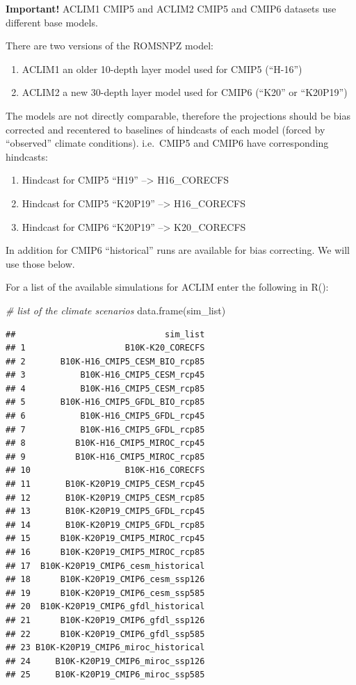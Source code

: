 \documentclass[
]{article}
\newenvironment{Shaded}{\begin{snugshade}}{\end{snugshade}}
\newcommand{\CommentTok}[1]{\textcolor[rgb]{0.56,0.35,0.01}{\textit{#1}}}
\newcommand{\FunctionTok}[1]{\textcolor[rgb]{0.00,0.00,0.00}{#1}}
\newcommand{\NormalTok}[1]{#1}
\providecommand{\tightlist}{%
  \setlength{\itemsep}{0pt}\setlength{\parskip}{0pt}}
\begin{document}
\textbf{Important!} ACLIM1 CMIP5 and ACLIM2 CMIP5 and CMIP6 datasets use
different base models.

There are two versions of the ROMSNPZ model:

\begin{enumerate}
\def\labelenumi{\arabic{enumi}.}
\tightlist
\item
  ACLIM1 an older 10-depth layer model used for CMIP5 (``H-16'')
\item
  ACLIM2 a new 30-depth layer model used for CMIP6 (``K20'' or
  ``K20P19'')
\end{enumerate}

The models are not directly comparable, therefore the projections should
be bias corrected and recentered to baselines of hindcasts of each model
(forced by ``observed'' climate conditions). i.e.~CMIP5 and CMIP6 have
corresponding hindcasts:

\begin{enumerate}
\def\labelenumi{\arabic{enumi}.}
\tightlist
\item
  Hindcast for CMIP5 ``H19'' --\textgreater{} H16\_CORECFS
\item
  Hindcast for CMIP5 ``K20P19'' --\textgreater{} H16\_CORECFS
\item
  Hindcast for CMIP6 ``K20P19'' --\textgreater{} K20\_CORECFS
\end{enumerate}

In addition for CMIP6 ``historical'' runs are available for bias
correcting. We will use those below.

For a list of the available simulations for ACLIM enter the following in
R():

\begin{Shaded}
\begin{Highlighting}[]
    \CommentTok{\# list of the climate scenarios}
    \FunctionTok{data.frame}\NormalTok{(sim\_list)}
\end{Highlighting}
\end{Shaded}

\begin{verbatim}
##                              sim_list
## 1                    B10K-K20_CORECFS
## 2       B10K-H16_CMIP5_CESM_BIO_rcp85
## 3           B10K-H16_CMIP5_CESM_rcp45
## 4           B10K-H16_CMIP5_CESM_rcp85
## 5       B10K-H16_CMIP5_GFDL_BIO_rcp85
## 6           B10K-H16_CMIP5_GFDL_rcp45
## 7           B10K-H16_CMIP5_GFDL_rcp85
## 8          B10K-H16_CMIP5_MIROC_rcp45
## 9          B10K-H16_CMIP5_MIROC_rcp85
## 10                   B10K-H16_CORECFS
## 11       B10K-K20P19_CMIP5_CESM_rcp45
## 12       B10K-K20P19_CMIP5_CESM_rcp85
## 13       B10K-K20P19_CMIP5_GFDL_rcp45
## 14       B10K-K20P19_CMIP5_GFDL_rcp85
## 15      B10K-K20P19_CMIP5_MIROC_rcp45
## 16      B10K-K20P19_CMIP5_MIROC_rcp85
## 17  B10K-K20P19_CMIP6_cesm_historical
## 18      B10K-K20P19_CMIP6_cesm_ssp126
## 19      B10K-K20P19_CMIP6_cesm_ssp585
## 20  B10K-K20P19_CMIP6_gfdl_historical
## 21      B10K-K20P19_CMIP6_gfdl_ssp126
## 22      B10K-K20P19_CMIP6_gfdl_ssp585
## 23 B10K-K20P19_CMIP6_miroc_historical
## 24     B10K-K20P19_CMIP6_miroc_ssp126
## 25     B10K-K20P19_CMIP6_miroc_ssp585
\end{verbatim}
\end{document}
